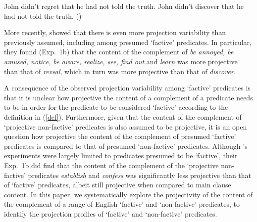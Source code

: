 \documentclass[11pt,fleqn]{article}
\newcommand{\6}{\mbox{$[\hspace*{-.6mm}[$}}
\newcommand{\9}{\mbox{$]\hspace*{-.6mm}]$}}
\newcommand{\citepos}[1]{\citeauthor{#1}'s \citeyear{#1}}
\begin{document}
\begin{exe}
\ex\label{semi-factive}
\begin{xlist}
\ex John didn't regret that he had not told the truth.
\ex John didn't discover that he had not told the truth.  
\hfill (\citealt[63]{karttunen71b})

\end{xlist}
\end{exe}
More recently, \citet*{tbd-variability} showed that there is even more projection variability than previously assumed, including among presumed `factive' predicates. In particular, they found (Exp.~1b) that the content of the complement of {\em be annoyed, be amused, notice, be aware, realize, see, find out} and {\em learn} was more projective than that of {\em reveal}, which in turn was more projective than that of {\em discover}. 

A consequence of the observed projection variability among `factive' predicates is that it is unclear how projective the content of a complement of a predicate needs to be in order for the predicate to be considered `factive' according to the definition in (\ref{def}). Furthermore, given that the content of the complement of `projective non-factive' predicates is also assumed to be projective, it is an open question how projective the content of the complement of presumed `factive' predicates is compared to that of presumed `non-factive' predicates. Although \citepos{tbd-variability} experiments were largely limited to predicates presumed to be `factive', their Exp.~1b did find that the content of the complement of the `projective non-factive' predicates {\em establish} and {\em confess} was significantly less projective than that of `factive' predicates, albeit still projective when compared to main clause content. In this paper, we systematically explore the projectivity of the content of the complement of a range of English `factive' and `non-factive' predicates, to identify the projection profiles of `factive' and `non-factive' predicates.

%
\end{document}
